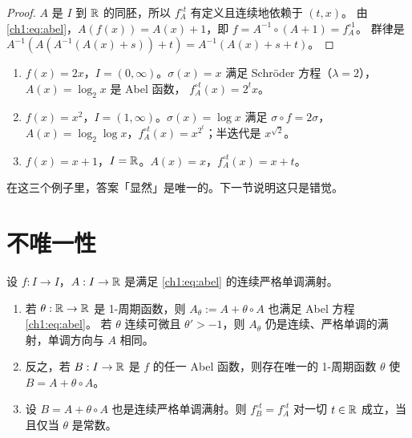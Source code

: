 \begin{proof}
$A$ 是 $I$ 到 $\mathbb{R}$ 的同胚，所以 $f_A^{\circ t}$ 有定义且连续地依赖于 $(t,x)$。
由 \eqref{ch1:eq:abel}，$A(f(x))=A(x)+1$，即 $f=A^{-1}\circ(A+1)=f_A^{\circ1}$。
群律是 $A^{-1}(A(A^{-1}(A(x)+s))+t)=A^{-1}(A(x)+s+t)$。
\end{proof}

\begin{example}\label{ch1:ex:elementary}
\begin{enumerate}[label=(\arabic*)]
\item $f(x)=2x$，$I=(0,\infty)$。$\sigma(x)=x$ 满足 Schröder 方程（$\lambda=2$），$A(x)=\log_2x$ 是 Abel 函数，
  $f_A^{\circ t}(x)=2^tx$。
\item $f(x)=x^2$，$I=(1,\infty)$。$\sigma(x)=\log x$ 满足 $\sigma\circ f=2\sigma$，
  $A(x)=\log_2\log x$，$f_A^{\circ t}(x)=x^{2^t}$；半迭代是 $x^{\sqrt2}$。
\item $f(x)=x+1$，$I=\mathbb{R}$。$A(x)=x$，$f_A^{\circ t}(x)=x+t$。
\end{enumerate}
\end{example}

在这三个例子里，答案「显然」是唯一的。下一节说明这只是错觉。

\section{不唯一性}\label{ch1:sec:nonunique}

\begin{proposition}\label{ch1:prop:nonunique}
设 $f:I\to I$，$A:I\to\mathbb{R}$ 是满足 \eqref{ch1:eq:abel} 的连续严格单调满射。
\begin{enumerate}[label=(\alph*)]
\item 若 $\theta:\mathbb{R}\to\mathbb{R}$ 是 1-周期函数，则 $A_\theta:=A+\theta\circ A$ 也满足 Abel 方程 \eqref{ch1:eq:abel}。
  若 $\theta$ 连续可微且 $\theta'>-1$，则 $A_\theta$ 仍是连续、严格单调的满射，单调方向与 $A$ 相同。
\item 反之，若 $B:I\to\mathbb{R}$ 是 $f$ 的任一 Abel 函数，则存在唯一的 1-周期函数 $\theta$ 使 $B=A+\theta\circ A$。
\item 设 $B=A+\theta\circ A$ 也是连续严格单调满射。则 $f_B^{\circ t}=f_A^{\circ t}$ 对一切 $t\in\mathbb{R}$ 成立，当且仅当 $\theta$ 是常数。
\end{enumerate}
\end{proposition}

